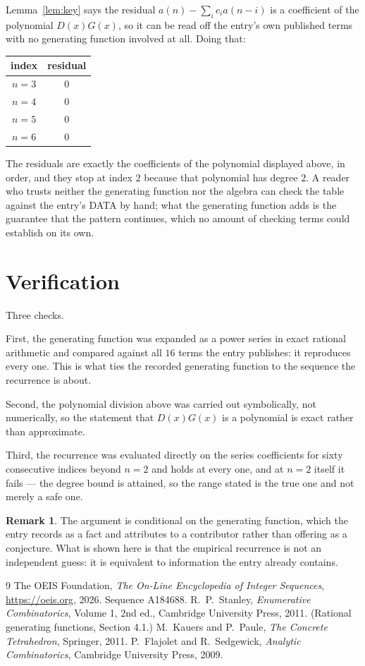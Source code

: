 \documentclass[11pt,a4paper]{article}
\theoremstyle{plain}
\theoremstyle{definition}
\newtheorem{remark}[theorem]{Remark}
\begin{document}
Lemma~\ref{lem:key} says the residual $a(n)-\sum_ic_ia(n-i)$ is a coefficient of the
polynomial $D(x)G(x)$, so it can be read off the entry's own published terms with no
generating function involved at all. Doing that:
\begin{center}
\begin{tabular}{cc}
index & residual \\ \hline
$n=3$ & $0$ \\
$n=4$ & $0$ \\
$n=5$ & $0$ \\
$n=6$ & $0$
\end{tabular}
\end{center}
The residuals are exactly the coefficients of the polynomial displayed above, in order, and
they stop at index $2$ because that polynomial has degree $2$. A reader who trusts
neither the generating function nor the algebra can check the table against the entry's DATA
by hand; what the generating function adds is the guarantee that the pattern continues, which
no amount of checking terms could establish on its own.

\section{Verification}

Three checks.

First, the generating function was expanded as a power series in exact rational arithmetic and
compared against all $16$ terms the entry publishes: it reproduces every one. This is
what ties the recorded generating function to the sequence the recurrence is about.

Second, the polynomial division above was carried out symbolically, not numerically, so the
statement that $D(x)G(x)$ is a polynomial is exact rather than approximate.

Third, the recurrence was evaluated directly on the series coefficients for sixty consecutive
indices beyond $n=2$ and holds at every one, and at $n=2$ itself it fails --- the
degree bound is attained, so the range stated is the true one and not merely a safe one.

\begin{remark}
The argument is conditional on the generating function, which the entry records as a fact and
attributes to a contributor rather than offering as a conjecture. What is shown here is that
the empirical recurrence is not an independent guess: it is equivalent to information the
entry already contains.
\end{remark}

\begin{thebibliography}{9}
 The OEIS Foundation, \emph{The On-Line Encyclopedia of Integer
Sequences}, \url{https://oeis.org}, 2026. Sequence A184688.
 R.~P.~Stanley, \emph{Enumerative Combinatorics}, Volume 1, 2nd ed.,
Cambridge University Press, 2011. (Rational generating functions, Section 4.1.)
 M.~Kauers and P.~Paule, \emph{The Concrete Tetrahedron}, Springer, 2011.
 P.~Flajolet and R.~Sedgewick, \emph{Analytic Combinatorics}, Cambridge
University Press, 2009.
\end{thebibliography}
\end{document}

